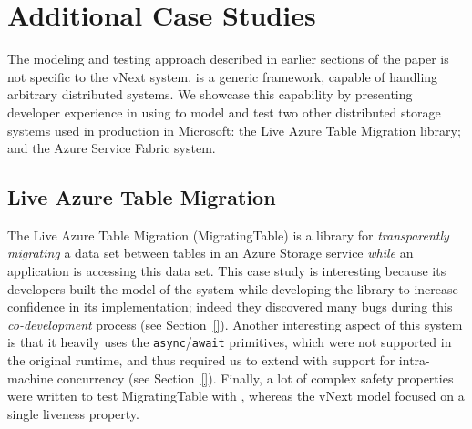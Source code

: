 \section{Additional Case Studies}
\label{sec:cases:other}

The modeling and testing approach described in earlier sections of the paper is not specific to the vNext system. \psharp is a generic framework, capable of handling arbitrary distributed systems. We showcase this capability by presenting developer experience in using \psharp to model and test two other distributed storage systems used in production in Microsoft: the Live Azure Table Migration library; and the Azure Service Fabric system.

\subsection{Live Azure Table Migration}
\label{sec:cases:migration}

The Live Azure Table Migration (MigratingTable) is a library for \emph{transparently migrating} a data set between tables in an Azure Storage service \emph{while} an application is accessing this data set. This case study is interesting because its developers built the \psharp model of the system while developing the library to increase confidence in its implementation; indeed they discovered many bugs during this \emph{co-development} process (see Section~\ref{}). Another interesting aspect of this system is that it heavily uses the \texttt{async}/\texttt{await} primitives, which were not supported in the original \psharp runtime, and thus required us to extend \psharp with support for intra-machine concurrency (see Section~\ref{}). Finally, a lot of complex safety properties were written to test MigratingTable with \psharp, whereas the vNext model focused on a single liveness property.

